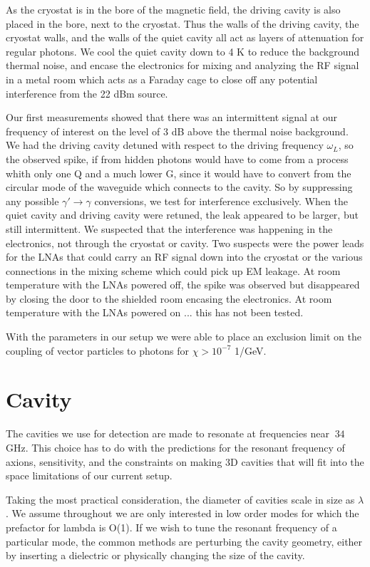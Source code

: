 \documentclass[11pt]{article}
\begin{document}
As the cryostat is in the bore of the magnetic field, the driving cavity is also placed in the bore, next to the cryostat. Thus the walls of the driving cavity, the cryostat walls, and the walls of the quiet cavity all act as layers of attenuation for regular photons. We cool the quiet cavity down to 4 K to reduce the background thermal noise, and encase the electronics for mixing and analyzing the RF signal in a metal room which acts as a Faraday cage to close off any potential interference from the 22 dBm source.

Our first measurements showed that there was an intermittent signal at our frequency of interest on the level of 3 dB above the thermal noise background. We had the driving cavity detuned with respect to the driving frequency $\omega_L$, so the observed spike, if from hidden photons would have to come from a process whith only one Q and a much lower G, since it would have to convert from the circular mode of the waveguide which connects to the cavity. So by suppressing any possible $\gamma'\rightarrow \gamma$ conversions, we test for interference exclusively. When the quiet cavity and driving cavity were retuned, the leak appeared to be larger, but still intermittent. We suspected that the interference was happening in the electronics, not through the cryostat or cavity. Two suspects were the power leads for the LNAs that could carry an RF signal down into the cryostat or the various connections in the mixing scheme which could pick up EM leakage. At room temperature with the LNAs powered off, the spike was observed but disappeared by closing the door to the shielded room encasing the electronics. At room temperature with the LNAs powered on ... this has not been tested.

With the parameters in our setup we were able to place an exclusion limit on the coupling of vector particles to photons for $\chi > 10^{-7}$ 1/GeV.

\section{Cavity}

The cavities we use for detection are made to resonate at frequencies near $~34$ GHz. This choice has to do with the predictions for the resonant frequency of axions, sensitivity, and the constraints on making 3D cavities that will fit into the space limitations of our current setup.

Taking the most practical consideration, the diameter of cavities scale in size as $\lambda$. We assume throughout we are only interested in low order modes for which the prefactor for lambda is O(1). If we wish to tune the resonant frequency of a particular mode, the common methods are perturbing the cavity geometry, either by inserting a dielectric or physically changing the size of the cavity. 
\end{document}
